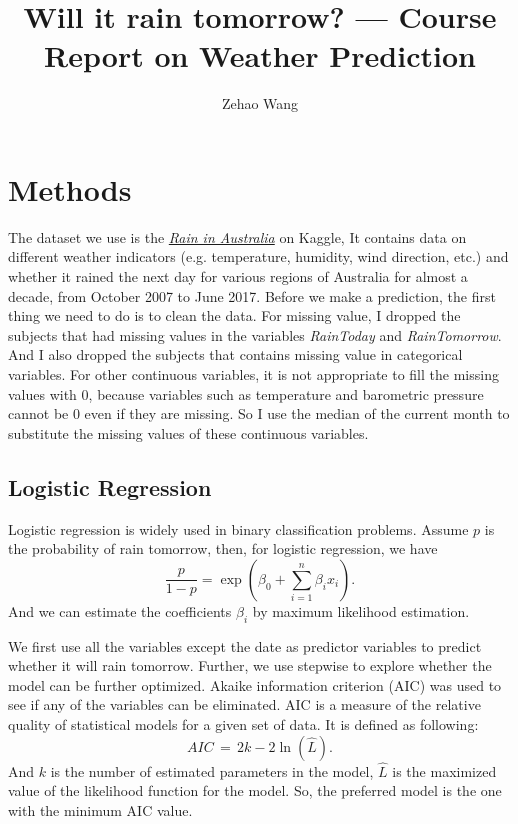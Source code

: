 \documentclass[11pt, a4paper, jou]{apa7}
\title{Will it rain tomorrow? --- Course Report on Weather Prediction}
\author{Zehao Wang}
\begin{document}
\maketitle
\section{Methods}

The dataset we use is the \href{https://www.kaggle.com/datasets/jsphyg/weather-dataset-rattle-package}{\emph{Rain in Australia}} on Kaggle, It contains data on different weather indicators (e.g. temperature, humidity, wind direction, etc.) and whether it rained the next day for various regions of Australia for almost a decade, from October 2007 to June 2017. Before we make a prediction, the first thing we need to do is to clean the data. 
For missing value, I dropped the subjects that had missing values in the variables \emph{RainToday} and \emph{RainTomorrow}. And I also dropped the subjects that contains missing value in categorical variables. For other continuous variables, it is not appropriate to fill the missing values with $0$, because variables such as temperature and barometric pressure cannot be $0$ even if they are missing. So I use the median of the current month to substitute the missing values of these continuous variables. 
\subsection{Logistic Regression}
    Logistic regression\cite{Berkson1944} is widely used in binary classification problems. Assume $p$ is the probability of rain tomorrow, then, for logistic regression, we have
    \begin{equation}
        \frac{p}{1-p}=\exp\left(\beta_0+\sum_{i=1}^{n}\beta_i x_i\right). 
    \end{equation}
    And we can estimate the coefficients $\beta_i$ by maximum likelihood estimation. 

    We first use all the variables except the date as predictor variables to predict whether it will rain tomorrow. Further, we use stepwise to explore whether the model can be further optimized. Akaike information criterion (AIC)\cite{Akaike1974} was used to see if any of the variables can be eliminated. AIC is a measure of the relative quality of statistical models for a given set of data. It is defined as following: 
    \begin{equation}
        \label{eq:AIC}
        {AIC} \,=\,2k-2\ln({\hat {L}}). 
    \end{equation}
    And $k$ is the number of estimated parameters in the model, $\hat{L}$ is the maximized value of the likelihood function for the model. So, the preferred model is the one with the minimum AIC value. 
\end{document}
